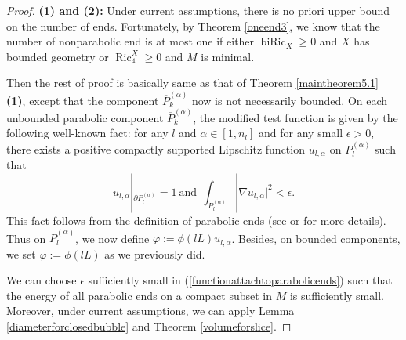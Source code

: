 \documentclass[11pt,letterpaper]{amsart}
\DeclareMathOperator{\Ric}{Ric}
\DeclareMathOperator{\biRic}{biRic}
\newcommand{\oP}{\overline{P}}
\newtheorem{theorem}{Theorem}[section]
\theoremstyle{definition}
\theoremstyle{remark}
\numberwithin{equation}{section}
\begin{document}
\begin{proof}
    

\textbf{(1) and (2):} Under current assumptions, there is no priori upper bound on the number of ends. Fortunately, by Theorem \ref{oneend3}, we know that the number of nonparabolic end is at most one if either $\biRic_X\geq 0$ and $X$ has bounded geometry or $\Ric^X_{4}\geq 0$ and $M$ is minimal.

Then the rest of proof is basically same as that of Theorem \ref{maintheorem5.1} \textbf{(1)}, except
 that the component $\oP_k^{(\alpha)}$ now is not necessarily bounded. On each unbounded parabolic component $\oP_k^{(\alpha)}$, the modified test function is given by the following well-known fact:  
for any $l$ and $\alpha\in [1,n_l]$ and for any small $\epsilon>0$, there exists a positive compactly supported Lipschitz function $u_{l,\alpha}$ on $P_l^{(\alpha)}$ such that
\begin{equation}\label{functionattachtoparabolicends}
    u_{l,\alpha}|_{\partial P_l^{(\alpha)}}=1 \ \text{and}\ \ \int_{P_l^{(\alpha)}}|\nabla u_{l,\alpha}|^2<\epsilon.
\end{equation}
This fact follows from the definition of parabolic ends (see \cite{peterwangspectrum} or \cite[Proposition 3.4]{chodosh-li-stryker} for more details). Thus on $\oP_l^{(\alpha)}$, we now define $\varphi:=\phi(lL)u_{l,\alpha}$. Besides, on bounded components, we set $\varphi:=\phi(lL)$ as we previously did. 

We can choose $\epsilon$ sufficiently small in (\ref{functionattachtoparabolicends}) such that the energy of all parabolic ends on a compact subset in $M$ is sufficiently small. Moreover, under current assumptions, we can apply Lemma \ref{diameterforclosedbubble} and Theorem \ref{volumeforslice}. 



\end{proof}




\end{document}
